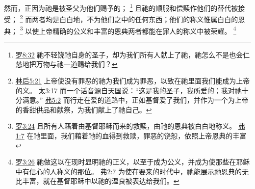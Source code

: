 \documentclass[12pt, a4paper, oneside]{ctexart}
\begin{document}
	然而，正因为祂是被圣父为他们赐予的；
	\footnote {
		\href{https://biblehub.com/romans/8-32.htm}{罗8:32} 祂不轻饶祂自身的圣子，却为我们所有人献上了祂，祂怎么不是也会仁慈地把万物与祂一道赐给我们？
	}
	且祂的顺服和偿赎作他们的替代被接受；
	\footnote {
		\href{https://biblehub.com/2_corinthians/5-21.htm}{林后5:21} 上帝使没有罪恶的祂为我们成为罪恶，以致在祂里面我们能成为上帝的义。
		\href{https://biblehub.com/matthew/3-17.htm}{太3:17} 而一个话音源自天国说：“这是我的圣子，我所爱的；我对祂十分满意。”
		\href{https://biblehub.com/ephesians/5-2.htm}{弗5:2} 而行走在爱的道路中，正如基督爱了我们，并作为一个为上帝的香甜供品和献祭，为我们献上了祂自己。
	}
	而两者均是白白地，不为他们之中的任何东西；他们的称义惟属白白的恩典；
	\footnote {
		\href{https://biblehub.com/romans/3-24.htm}{罗3:24} 且所有人藉着由基督耶稣而来的救赎，由祂的恩典被白白地称义。
		\href{https://biblehub.com/ephesians/1-7.htm}{弗1:7} 在祂里面，我们藉着祂的血得到救赎，罪恶的饶恕，依照上帝恩典的丰富
	}
	以使上帝精确的公义和丰富的恩典两者都能在罪人的称义中被荣耀。
	\footnote {
		\href{https://biblehub.com/romans/3-26.htm}{罗3:26} 祂做这以在现时显明祂的正义，以至于成为公义，并成为使那些在耶稣中有信心的人称义的那位。
		\href{https://biblehub.com/ephesians/2-7.htm}{弗2:7} 为使在要来的时代中，祂能展示祂恩典的无比丰富，就在基督耶稣中以祂的温良被表达给我们。
	}
\end{document}
